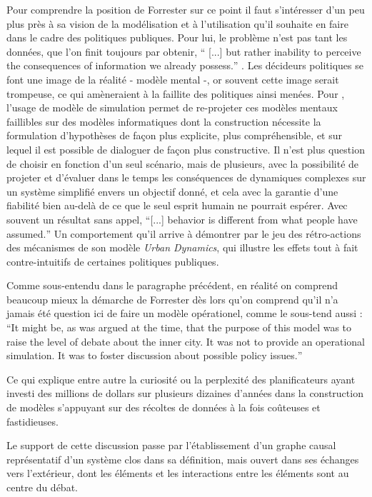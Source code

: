 Pour comprendre la position de Forrester sur ce point il faut s'intéresser d'un peu plus près à sa vision de la modélisation et à l'utilisation qu'il souhaite en faire dans le cadre des politiques publiques. Pour lui, le problème n'est pas tant les données, que l'on finit toujours par obtenir, \foreignquote{english}{ [...] but rather inability to perceive the consequences of information we already possess.}  . Les décideurs politiques se font une image de la réalité - modèle mental -, or souvent cette image serait trompeuse, ce qui amèneraient à la faillite des politiques ainsi menées. Pour \textcite{Forrester1971}, l'usage de modèle de simulation permet de re-projeter ces modèles mentaux faillibles sur des modèles informatiques dont la construction nécessite la formulation d'hypothèses de façon plus explicite, plus compréhensible, et sur lequel il est possible de dialoguer de façon plus constructive. Il n'est plus question de choisir en fonction d'un seul scénario, mais de plusieurs, avec la possibilité de projeter et d'évaluer dans le temps les conséquences de dynamiques complexes sur un système simplifié envers un objectif donné, et cela avec la garantie d'une fiabilité bien au-delà de ce que le seul esprit humain ne pourrait espérer. Avec souvent un résultat sans appel, \foreignquote{english}{[...] behavior is different from what people have assumed.} Un comportement qu'il arrive à démontrer par le jeu des rétro-actions des mécanismes de son modèle \textit{Urban Dynamics}, qui illustre les effets tout à fait contre-intuitifs de certaines politiques publiques.

Comme sous-entendu dans le paragraphe précédent, en réalité on comprend beaucoup mieux la démarche de Forrester dès lors qu'on comprend qu'il n'a jamais été question ici de faire un modèle opérationel, comme le sous-tend aussi \autocite{Batty2001} : \foreignquote{english}{It might be, as was argued at the time, that the purpose of this model was to raise the level of debate about the inner city. It was not to provide an operational simulation. It was to foster discussion about possible policy issues.}

Ce qui explique entre autre la curiosité ou la perplexité des planificateurs \autocite{Lee1973} ayant investi des millions de dollars sur plusieurs dizaines d'années dans la construction de modèles s'appuyant sur des récoltes de données à la fois coûteuses et fastidieuses.

Le support de cette discussion passe par l'établissement d'un graphe causal représentatif d'un système clos dans sa définition, mais ouvert dans ses échanges vers l'extérieur, dont les éléments et les interactions entre les éléments sont au centre du débat. %

